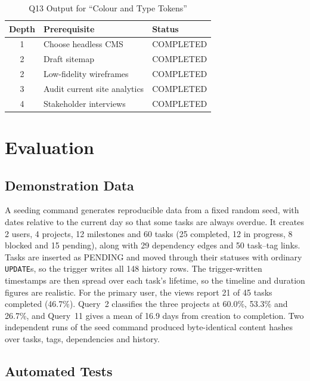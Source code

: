 \documentclass[conference]{IEEEtran}
\begin{document}
\begin{table}[t]
\caption{Q13 Output for ``Colour and Type Tokens''}
\label{tab:chain}
\centering
\scriptsize
\begin{tabular}{@{}c l l@{}}
\toprule
\textbf{Depth} & \textbf{Prerequisite} & \textbf{Status} \\
\midrule
1 & Choose headless CMS & COMPLETED \\
2 & Draft sitemap & COMPLETED \\
2 & Low-fidelity wireframes & COMPLETED \\
3 & Audit current site analytics & COMPLETED \\
4 & Stakeholder interviews & COMPLETED \\
\bottomrule
\end{tabular}
\end{table}

\section{Evaluation}
\label{sec:eval}

\subsection{Demonstration Data}

A seeding command generates reproducible data from a fixed random seed, with
dates relative to the current day so that some tasks are always overdue. It
creates 2 users, 4 projects, 12 milestones and 60 tasks (25 completed, 12 in
progress, 8 blocked and 15 pending), along with 29 dependency edges and 50
task--tag links. Tasks are inserted as PENDING and moved through their statuses
with ordinary \texttt{UPDATE}s, so the trigger writes all 148 history rows. The
trigger-written timestamps are then spread over each task's lifetime, so the
timeline and duration figures are realistic. For the primary user, the views
report 21 of 45 tasks completed (46.7\%). Query~2 classifies the three projects
at 60.0\%, 53.3\% and 26.7\%, and Query~11 gives a mean of 16.9 days from
creation to completion. Two independent runs of the seed command produced
byte-identical content hashes over tasks, tags, dependencies and history.

\subsection{Automated Tests}
\end{document}

